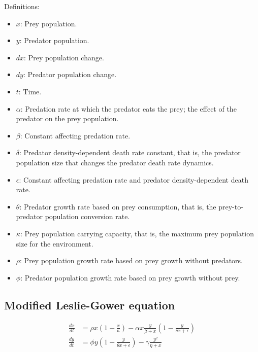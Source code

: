 Definitions:
\begin{itemize}
\item $x$: Prey population.
\item $y$: Predator population.
\item $dx$: Prey population change.
\item $dy$: Predator population change.
\item $t$: Time.
\item $\alpha$: Predation rate at which the predator eats the prey; the effect of the predator on the prey population.
\item $\beta$: Constant affecting predation rate.
\item $\delta$: Predator density-dependent death rate constant, that is, the predator population size that changes the predator death rate dynamics.
\item $\epsilon$: Constant affecting predation rate and predator density-dependent death rate.
\item $\theta$: Predator growth rate based on prey consumption, that is, the prey-to-predator population conversion rate.
\item $\kappa$: Prey population carrying capacity, that is, the maximum prey population size for the environment.
\item $\rho$: Prey population growth rate based on prey growth without predators.
\item $\phi$: Predator population growth rate based on prey growth without prey.
\end{itemize}

\subsection{Modified Leslie-Gower equation}
\begin{equation*}
\begin{split}
\frac{dx}{dt} &= \rho x \left(1 - \frac{x}{\kappa}\right) - \alpha x \frac{y}{\beta + x} \left(1 - \frac{y}{\delta x + \epsilon}\right) \\
\frac{dy}{dt} &= \phi y \left(1 - \frac{y}{\theta x + \epsilon}\right) - \gamma \frac{y^2}{\eta + x}
\end{split}
\end{equation*}

